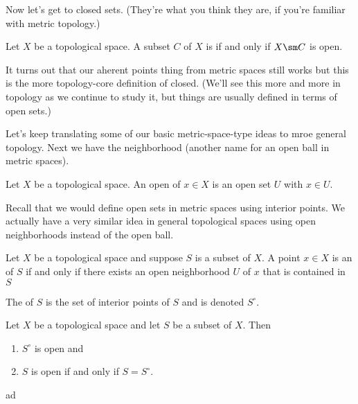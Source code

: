\documentclass[class=article, crop=false]{standalone}
\begin{document}
Now let's get to closed sets. (They're what you think they are, if you're familiar with metric topology.)

\begin{defn}
  Let $X$ be a topological space. A subset $C$ of $X$ is  if and only if $X\sm C$ is open.
\end{defn}
\noindent It turns out that our aherent points thing from metric spaces still works but this is the more topology-core definition of closed. (We'll see this more and more in topology as we continue to study it, but things are usually defined in terms of open sets.)

Let's keep translating some of our basic metric-space-type ideas to mroe general topology. Next we have the neighborhood (another name for an open ball in metric spaces).

\begin{defn}[Neighborhood]
  Let $X$ be a topological space. An open  of $x \in X$ is an open set $U$ with $x \in U$.
\end{defn}

Recall that we would define open sets in metric spaces using interior points. We actually have a very similar idea in general topological spaces using open neighborhoods instead of the open ball.

\begin{defn}
  Let $X$ be a topological space and suppose $S$ is a subset of $X$. A point $x \in X$ is an  of $S$ if and only if there exists an open neighborhood $U$ of $x$ that is contained in $S$

  The  of $S$ is the set of interior points of $S$ and is denoted $S^\circ$.
\end{defn}

\begin{prop}
  Let $X$ be a topological space and let $S$ be a subset of $X$. Then
  \begin{enumerate}[(1)]
    \item $S^\circ$ is open and
    \item $S$ is open if and only if $S = S^\circ$.
  \end{enumerate}
\end{prop}
\begin{pf}
  ad
\end{pf}
\end{document}
